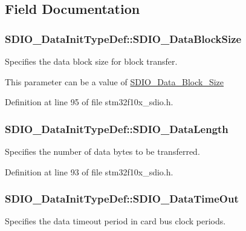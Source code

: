 \subsection{Field Documentation}
\hypertarget{struct_s_d_i_o___data_init_type_def_a2252d17c4b3182830eb9f400489cb10f}{
\subsubsection[{S\-D\-I\-O\-\_\-\-Data\-Block\-Size}]{ S\-D\-I\-O\-\_\-\-Data\-Init\-Type\-Def\-::\-S\-D\-I\-O\-\_\-\-Data\-Block\-Size}}\label{struct_s_d_i_o___data_init_type_def_a2252d17c4b3182830eb9f400489cb10f}
\begin{DoxyVerb}  Specifies the data block size for block transfer.
\end{DoxyVerb}
 This parameter can be a value of \hyperlink{group___s_d_i_o___data___block___size}{S\-D\-I\-O\-\_\-\-Data\-\_\-\-Block\-\_\-\-Size} 

Definition at line 95 of file stm32f10x\-\_\-sdio.\-h.

\hypertarget{struct_s_d_i_o___data_init_type_def_ac325889a6dd582130a752aafc3ec9ee9}{
\subsubsection[{S\-D\-I\-O\-\_\-\-Data\-Length}]{ S\-D\-I\-O\-\_\-\-Data\-Init\-Type\-Def\-::\-S\-D\-I\-O\-\_\-\-Data\-Length}}\label{struct_s_d_i_o___data_init_type_def_ac325889a6dd582130a752aafc3ec9ee9}
Specifies the number of data bytes to be transferred. 

Definition at line 93 of file stm32f10x\-\_\-sdio.\-h.

\hypertarget{struct_s_d_i_o___data_init_type_def_a6877ec1042a273e228114e5362b93aa1}{
\subsubsection[{S\-D\-I\-O\-\_\-\-Data\-Time\-Out}]{ S\-D\-I\-O\-\_\-\-Data\-Init\-Type\-Def\-::\-S\-D\-I\-O\-\_\-\-Data\-Time\-Out}}\label{struct_s_d_i_o___data_init_type_def_a6877ec1042a273e228114e5362b93aa1}
Specifies the data timeout period in card bus clock periods. 

